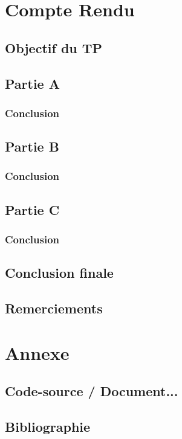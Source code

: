 \documentclass[a4paper, 12pt]{report}
\begin{document}



\chapter{Compte Rendu}
\section{Objectif du TP}

\section{Partie A}
\subsection{}
\subsection{Conclusion}

\section{Partie B}
\subsection{}
\subsection{Conclusion}

\section{Partie C}
\subsection{}
\subsection{Conclusion}

\section{Conclusion finale}

\section{Remerciements}


\chapter{Annexe}
\section{Code-source / Document...}
\section{Bibliographie}
\end{document}
